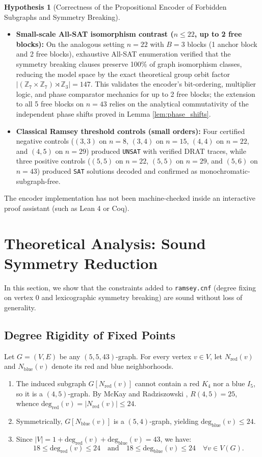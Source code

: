 \documentclass[11pt,a4paper]{article}
\theoremstyle{definition}
\newtheorem{hypothesis}{Hypothesis}
\begin{document}
\begin{hypothesis}[Correctness of the Propositional Encoder of Forbidden Subgraphs and Symmetry Breaking]
\begin{itemize}
    \item \textbf{Small-scale All-SAT isomorphism contrast ($n \le 22$, up to 2 free blocks):} On the analogous setting $n=22$ with $B=3$ blocks (1 anchor block and 2 free blocks), exhaustive All-SAT enumeration verified that the symmetry breaking clauses preserve 100\% of graph isomorphism classes, reducing the model space by the exact theoretical group orbit factor $|(\mathbb{Z}_7 \times \mathbb{Z}_7) \rtimes \mathbb{Z}_3| = 147$. This validates the encoder's bit-ordering, multiplier logic, and phase comparator mechanics for up to 2 free blocks; the extension to all 5 free blocks on $n=43$ relies on the analytical commutativity of the independent phase shifts proved in Lemma \ref{lem:phase_shifts}.
    \item \textbf{Classical Ramsey threshold controls (small orders):} Four certified negative controls ($(3,3)$ on $n=8$, $(3,4)$ on $n=15$, $(4,4)$ on $n=22$, and $(4,5)$ on $n=29$) produced \texttt{UNSAT} with verified DRAT traces, while three positive controls ($(5,5)$ on $n=22$, $(5,5)$ on $n=29$, and $(5,6)$ on $n=43$) produced \texttt{SAT} solutions decoded and confirmed as monochromatic-subgraph-free.
\end{itemize}
The encoder implementation has not been machine-checked inside an interactive proof assistant (such as Lean 4 or Coq).
\end{hypothesis}

\section{Theoretical Analysis: Sound Symmetry Reduction}
\label{sec:theory}

In this section, we show that the constraints added to \texttt{ramsey.cnf} (degree fixing on vertex 0 and lexicographic symmetry breaking) are sound without loss of generality.

\subsection{Degree Rigidity of Fixed Points}

Let $G = (V, E)$ be any $(5,5,43)$-graph. For every vertex $v \in V$, let $N_{\text{red}}(v)$ and $N_{\text{blue}}(v)$ denote its red and blue neighborhoods.
\begin{enumerate}
    \item The induced subgraph $G[N_{\text{red}}(v)]$ cannot contain a red $K_4$ nor a blue $I_5$, so it is a $(4,5)$-graph. By McKay and Radziszowski \cite{mckay1995}, $R(4,5) = 25$, whence $\text{deg}_{\text{red}}(v) = |N_{\text{red}}(v)| \le 24$.
    \item Symmetrically, $G[N_{\text{blue}}(v)]$ is a $(5,4)$-graph, yielding $\text{deg}_{\text{blue}}(v) \le 24$.
    \item Since $|V| = 1 + \text{deg}_{\text{red}}(v) + \text{deg}_{\text{blue}}(v) = 43$, we have:
    \[
    18 \le \text{deg}_{\text{red}}(v) \le 24 \quad \text{and} \quad 18 \le \text{deg}_{\text{blue}}(v) \le 24 \quad \forall v \in V(G).
    \]
\end{enumerate}
\end{document}
